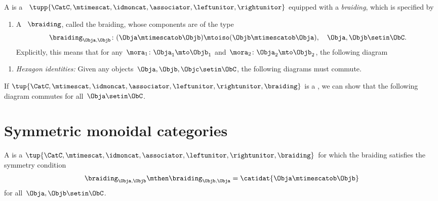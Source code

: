 

\begin{ctdefinition}
    \label{def:braided_moncat}
    A  is a ~$\tupp{\CatC,\mtimescat, \idmoncat, \associator, \leftunitor, \rightunitor}$ equipped with a \emph{braiding}, which is specified by

    \constit
    \begin{enumerate}
        \item A ~$\braiding$, called the braiding, whose components are of the type
              \begin{equation}
                  \label{eq:braiding_symmetry}
                  \braiding_{\Obja,\Objb}\colon (\Obja\mtimescatob \Objb)\mtoiso (\Objb\mtimescatob \Obja), \quad \Obja,\Objb \setin \ObC.
              \end{equation}
              Explicitly, this means that for any~$\mora_1\colon \Obja_1\mto \Objb_1$ and~$\mora_2\colon \Obja_2\mto \Objb_2$, the following diagram
    \end{enumerate}

    \condit
    \begin{enumerate}
        \item \emph{Hexagon identities:} Given any objects~$\Obja,\Objb,\Objc\setin \ObC$, the following diagrams must commute.
    \end{enumerate}
\end{ctdefinition}

\begin{remark}
    If $\tup{\CatC,\mtimescat, \idmoncat, \associator, \leftunitor, \rightunitor, \braiding}$ is a , we can show that the following diagram commutes for all~$\Obja \setin \ObC$.
\end{remark}

\section{Symmetric monoidal categories}

\begin{ctdefinition}
    \label{def:sym-mon-cat}
    A  is a  $\tup{\CatC,\mtimescat, \idmoncat, \associator, \leftunitor, \rightunitor, \braiding}$ for which the braiding satisfies the symmetry condition
    \begin{equation}
        \label{eq:braiding-symmetry}
        \braiding_{\Obja,\Objb} \mthen \braiding_{\Objb,\Obja} = \catidat{\Obja \mtimescatob \Objb}
    \end{equation}
    for all~$\Obja, \Objb \setin \ObC$.
\end{ctdefinition}

